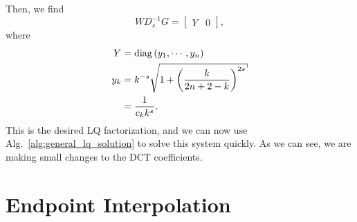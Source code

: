 Then, we find
%
\begin{equation}
    WD_{s}^{-1}G = \begin{bmatrix} Y & 0 \end{bmatrix},
\end{equation}
%
where
%
\begin{align}
    Y &= \diag\parens{y_{1},\cdots,y_{n}} \nonumber\\
    y_{k} &= k^{-s}\sqrt{1 + \parens{\frac{k}{2n+2-k}}^{2s}} \nonumber\\
    &= \frac{1}{c_{k}k^{s}}.
    \label{eq:v1_I_2n_Givens_y_def}
\end{align}
%
This is the desired LQ factorization, and we can now use
Alg.~\ref{alg:general_lq_solution} to solve this system quickly.
As we can see, we are making small changes to the DCT coefficients.



\section{Endpoint Interpolation}
\label{sec:CV_1D_Endpoints}

